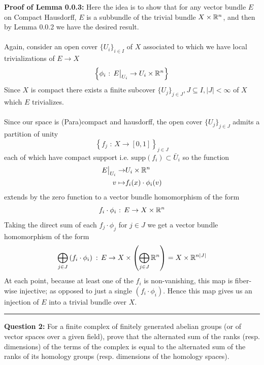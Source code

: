 \documentclass[11pt]{article}
\begin{document}
\begin{dottedbox}
  \textbf{Proof of Lemma 0.0.3:} Here the idea is to show that for any vector bundle $E$ on Compact Hausdorff, $E$ is a subbundle of the trivial bundle $X \times \mathbb{R}^n$, and then by Lemma 0.0.2 we have the desired result.
  \\
  \\
  Again, consider an open cover $\{U_i\}_{i \in I}$ of $X$ associated to which we have local trivializations of $E \rightarrow X$ $$ \left\{ \phi_i \text{ : } \restr{E}{U_{i}} \rightarrow U_i \times \R^n \right\} $$ Since $X$ is compact there exists a finite subcover $\{U_{j}\}_{j \in J}, J \subseteq I, |J| < \infty$ of $X$ which $E$ trivializes.
  \\
  \\
  Since our space is (Para)compact and hausdorff, the open cover $\{U_j\}_{j \in J}$ admits a partition of unity $$ \left\{ f_{j} \text{ : } X \rightarrow [0, 1] \right\}_{j \in J} $$ each of which have compact support i.e. $\mathrm{supp}(f_i) \subset \bar{U}_{i}$ so the function
  \begin{align*}
    \restr{E}{U_{i}} \rightarrow &U_i \times \R^n \\
    v \mapsto &f_i(x) \cdot \phi_i(v)
  \end{align*}
  extends by the zero function to a vector bundle homomorphism of the form $$ f_i \cdot \phi_i \text{ : } E \rightarrow X \times \mathbb{R}^n $$ Taking the direct sum of each $f_j \cdot \phi_j$ for $j \in J$ we get a vector bundle homomorphism of the form
  $$ \bigoplus_{j \in J} \left(f_i \cdot \phi_i\right) \text{ : } E \rightarrow X \times \left( \bigoplus_{j \in J} \mathbb{R}^n \right) = X \times \mathbb{R}^{n|J|} $$
  At each point, because at least one of the $f_i$ is non-vanishing, this map is fiber-wise injective; as opposed to just a single $(f_i \cdot \phi_i)$. Hence this map gives us an injection of $E$ into a trivial bundle over $X$.  
\end{dottedbox}


\vskip 0.5cm
\hrule
\pagebreak



\begin{bluebox}
  \textbf{Question 2:} For a finite complex of finitely generated abelian groups (or of vector spaces over a given field), prove that the alternated sum of the ranks (resp. dimensions) of the terms of the complex is equal to the alternated sum of the ranks of its homology groups (resp. dimensions of the homology spaces).
\end{bluebox}
\end{document}
